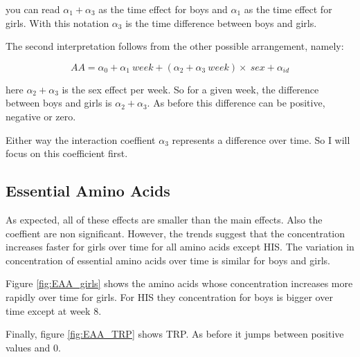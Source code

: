 \documentclass[12pt]{article}
\begin{document}
you can read $\alpha_1  + \alpha_3 $ as the time effect for boys and $\alpha_1$ as the time effect for girls. With this notation $\alpha_3$ is the time difference between boys and girls.

The second interpretation follows from the other possible arrangement, namely:

\begin{equation} \label{eq:model3b}
  AA = \alpha_0 + \alpha_1 \ week + \left(\alpha_2  + \alpha_3 \ week \right) \times \ sex  + \alpha_{id}
\end{equation}

here $\alpha_2 + \alpha_3$ is the sex effect per week. So for a given week, the difference between boys and girls is $\alpha_2 + \alpha_3$. As before this difference can be positive, negative or zero.

Either way the interaction coeffient $\alpha_3$ represents a difference over time. So I will focus on this coefficient first.

\subsection{Essential Amino Acids}

As expected, all of these effects are smaller than the main effects. Also the coeffient are non significant. However, the trends suggest that the concentration increases faster for girls over time for all amino acids except HIS. The variation in concentration of essential amino acids over time is similar for boys and girls.

Figure \ref{fig:EAA_girls} shows the amino acids whose concentration increases more rapidly over time for girls. For HIS they concentration for boys is bigger over time except at week $8$.

Finally, figure \ref{fig:EAA_TRP} shows TRP. As before it jumps between positive values and $0$.
\end{document}
